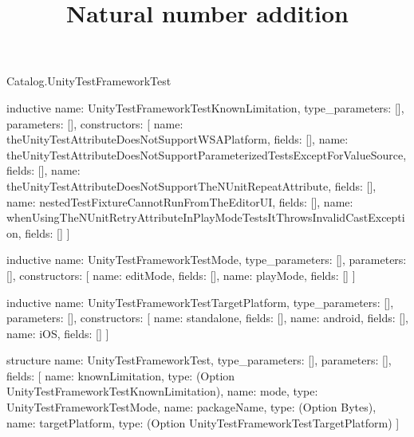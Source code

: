\begin{lexlean}{Catalog.UnityTestFrameworkTest}
\title{Natural number addition}
\begin{semanticmodule}
inductive{
  name: UnityTestFrameworkTestKnownLimitation,
  type_parameters: [],
  parameters: [],
  constructors: [
    {name: theUnityTestAttributeDoesNotSupportWSAPlatform, fields: []},
    {name: theUnityTestAttributeDoesNotSupportParameterizedTestsExceptForValueSource, fields: []},
    {name: theUnityTestAttributeDoesNotSupportTheNUnitRepeatAttribute, fields: []},
    {name: nestedTestFixtureCannotRunFromTheEditorUI, fields: []},
    {name: whenUsingTheNUnitRetryAttributeInPlayModeTestsItThrowsInvalidCastException, fields: []}
  ]
}

inductive{
  name: UnityTestFrameworkTestMode,
  type_parameters: [],
  parameters: [],
  constructors: [
    {name: editMode, fields: []},
    {name: playMode, fields: []}
  ]
}

inductive{
  name: UnityTestFrameworkTestTargetPlatform,
  type_parameters: [],
  parameters: [],
  constructors: [
    {name: standalone, fields: []},
    {name: android, fields: []},
    {name: iOS, fields: []}
  ]
}

structure{
  name: UnityTestFrameworkTest,
  type_parameters: [],
  parameters: [],
  fields: [
    {name: knownLimitation, type: (Option UnityTestFrameworkTestKnownLimitation)},
    {name: mode, type: UnityTestFrameworkTestMode},
    {name: packageName, type: (Option Bytes)},
    {name: targetPlatform, type: (Option UnityTestFrameworkTestTargetPlatform)}
  ]
}
\end{semanticmodule}
\end{lexlean}
